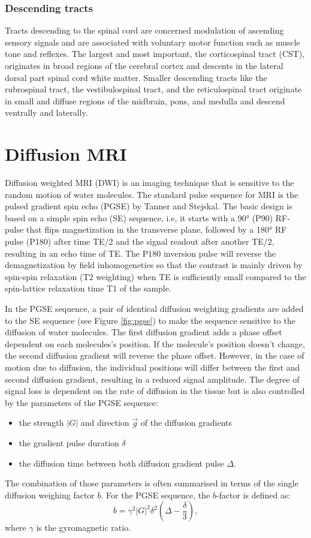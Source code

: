 \subsubsection*{Descending tracts}
\label{sec:section_name}
Tracts descending to the spinal cord are concerned modulation of ascending sensory signals and are associated with voluntary motor function such as muscle tone and reflexes. The largest and most important, the corticospinal tract (CST), originates in broad regions of the cerebral cortex and descents in the lateral dorsal part spinal cord white matter. Smaller descending tracts like the rubrospinal tract, the vestibulospinal tract, and the reticulospinal tract originate in small and diffuse regions of the midbrain, pons, and medulla and descend ventrally and laterally.

\section{Diffusion MRI}
Diffusion weighted MRI (DWI) is an imaging technique that is sensitive to the random motion of water molecules. The standard pulse sequence for MRI is the pulsed gradient spin echo (PGSE) by Tanner and Stejskal\cite{tanner65}. The basic design is based on a simple spin echo (SE) sequence, i.e, it starts with a 90° (P90) RF-pulse that flips magnetization in the transverse plane, followed by a 180° RF pulse (P180) after time TE/2 and the signal readout after another TE/2, resulting in an echo time of TE. The P180 inversion pulse will reverse the demagnetization by field inhomogeneties so that the contrast is mainly driven by spin-spin relaxation (T2 weighting) when TE is sufficiently small compared to the spin-lattice relaxation time T1 of the sample. 


In the PGSE sequence, a pair of identical diffusion weighting gradients are added to the SE sequence (see Figure \ref{fig:pgse}) to make the sequence sensitive to the diffusion of water molecules. The first diffusion gradient adds a phase offset dependent on each molecules's position. If the molecule's position doesn't change, the second diffusion gradient will reverse the phase offset. However, in the case of motion due to diffusion, the individual positions will differ between the first and second diffusion gradient, resulting in a reduced signal amplitude. The degree of signal loss is dependent on the rate of diffusion in the tissue but is also controlled by the parameters of the PGSE sequence:
\begin{itemize}
	\item the strength $|G|$ and direction $\vec{g}$ of the diffusion gradients
	\item the gradient pulse duration $\delta$
	\item the diffusion time between both diffusion gradient pulse $\Delta$.
\end{itemize}
The combination of those parameters is often summarised in terms of the single diffusion weighing factor $b$. For the PGSE sequence, the $b$-factor is defined as:
\begin{equation}
	b = \gamma^2|G|^2\delta^2(\Delta-\frac{\delta}{3}),
    \label{eq:bvalue}
\end{equation}
where $\gamma$ is the gyromagnetic ratio.
